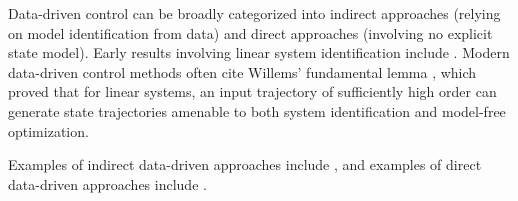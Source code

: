 Data-driven control can be broadly categorized into indirect approaches (relying on model identification from data) and direct approaches (involving no explicit state model).  Early results involving linear system identification include \cite{ho1966effective, juang1985eigensystem, ljung1987theory, smith1989model, bayard1992criterion, schrama1992accurate, makila1995worst, mckelvey1996subspace, de1997suboptimal, ljung1998system}.  Modern data-driven control methods often cite Willems' fundamental lemma \cite{willems2005note}, which proved that for linear systems, an input trajectory of sufficiently high order can generate state trajectories amenable to both system identification and model-free optimization.

Examples of indirect data-driven approaches include \cite{qin2006overview, di2021confidence, shin2020unifying, proctor2016dmdc, lu2020characterizing, zhang2019online, leyang2012properties}, and examples of direct data-driven approaches include \cite{de2019formulas, berberich2020robust, van2020noisy, berberich2022combining}.

